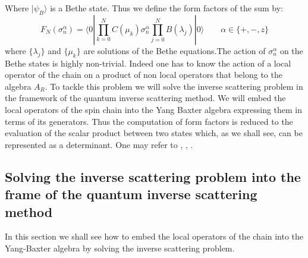 \documentclass[12pt]{article}
\begin{document}
Where $|\psi_{B}\rangle$ is a Bethe state. Thus we define the form factors of the sum by:
\begin{equation}
F_{N}(\sigma_{n}^{\alpha})=\langle 0|\prod_{k=0}^{N}C(\mu_{k}) \sigma_{n}^{\alpha} \prod_{j=0}^{N}B(\lambda_{j})|0\rangle  \qquad
\alpha \in\{+,-,z\}
\end{equation}
where $\{\lambda_{j}\}$  and  $\{\mu_{k}\}$ are solutions of the Bethe equations.The action of $ \sigma_{n}^{\alpha} $ on the Bethe states is highly non-trivial. Indeed one has to know the action of a local operator of the chain on a product of non local operators that belong to the algebra $ A_ {R} $. To tackle this problem we will solve the inverse scattering problem in the framework of the quantum inverse scattering method. We will embed the local operators of the spin chain into the Yang Baxter algebra expressing them in terms of its generators. Thus the computation of form factors is reduced to the evaluation of the scalar product between two states which, as we shall see, can be represented as a determinant. One may refer to \cite{KitMT99}, \cite{Sla89}, \cite{MaiT00}.
\pagebreak
\subsection{Solving the inverse scattering problem into the frame of the quantum inverse scattering method}
In this section we shall see how to embed the local operators of the chain into the Yang-Baxter algebra by solving the inverse scattering problem.
\end{document}
